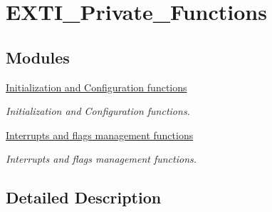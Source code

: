 \hypertarget{group___e_x_t_i___private___functions}{\section{E\-X\-T\-I\-\_\-\-Private\-\_\-\-Functions}
\label{group___e_x_t_i___private___functions}
}
\subsection*{Modules}
\begin{DoxyCompactItemize}
\item 
\hyperlink{group___e_x_t_i___group1}{Initialization and Configuration functions}
\begin{DoxyCompactList}\small\item\em Initialization and Configuration functions. \end{DoxyCompactList}\item 
\hyperlink{group___e_x_t_i___group2}{Interrupts and flags management functions}
\begin{DoxyCompactList}\small\item\em Interrupts and flags management functions. \end{DoxyCompactList}\end{DoxyCompactItemize}


\subsection{Detailed Description}
